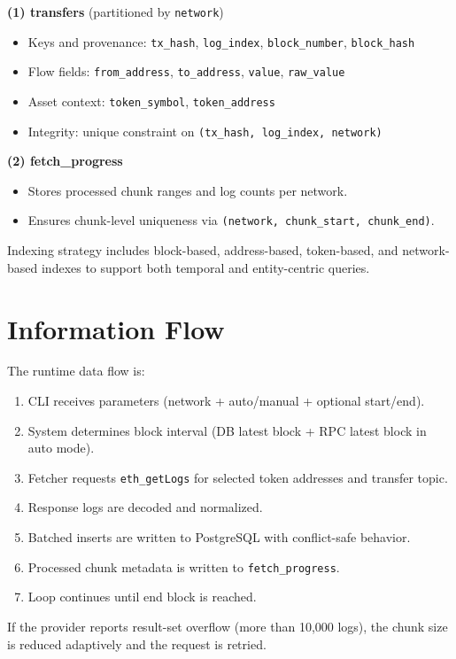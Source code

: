 \documentclass[a4paper,12pt]{report}
\begin{document}
\textbf{(1) transfers} (partitioned by \texttt{network})
\begin{itemize}
\item Keys and provenance: \texttt{tx\_hash}, \texttt{log\_index}, \texttt{block\_number}, \texttt{block\_hash}
\item Flow fields: \texttt{from\_address}, \texttt{to\_address}, \texttt{value}, \texttt{raw\_value}
\item Asset context: \texttt{token\_symbol}, \texttt{token\_address}
\item Integrity: unique constraint on \texttt{(tx\_hash, log\_index, network)}
\end{itemize}

\textbf{(2) fetch\_progress}
\begin{itemize}
\item Stores processed chunk ranges and log counts per network.
\item Ensures chunk-level uniqueness via \texttt{(network, chunk\_start, chunk\_end)}.
\end{itemize}

Indexing strategy includes block-based, address-based, token-based, and network-based indexes to
support both temporal and entity-centric queries.

\section{Information Flow}
The runtime data flow is:
\begin{enumerate}
\item CLI receives parameters (network + auto/manual + optional start/end).
\item System determines block interval (DB latest block + RPC latest block in auto mode).
\item Fetcher requests \texttt{eth\_getLogs} for selected token addresses and transfer topic.
\item Response logs are decoded and normalized.
\item Batched inserts are written to PostgreSQL with conflict-safe behavior.
\item Processed chunk metadata is written to \texttt{fetch\_progress}.
\item Loop continues until end block is reached.
\end{enumerate}

If the provider reports result-set overflow (more than 10,000 logs), the chunk size is reduced
adaptively and the request is retried.
\end{document}
